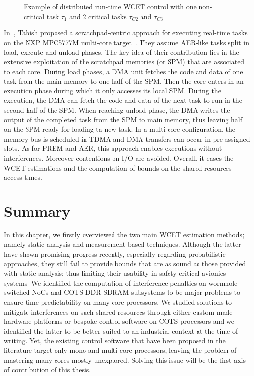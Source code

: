 \documentclass[main.tex]{subfiles}
\begin{document}
\begin{figure}
    \centering
    
    \caption{Example of distributed run-time WCET control with one non-critical task $\tau_1$ and 2 critical tasks $\tau_{C2}$ and $\tau_{C3}$ }
    \label{fig_stateOfTheArt_DistribWCETController}
\end{figure}

In~\cite{Tabish2016}, Tabish \etal proposed a scratchpad-centric approach for
executing real-time tasks on the NXP MPC5777M multi-core
target~\cite{MPC5777M}. They assume AER-like tasks split in load, execute and
unload phases. The key idea of their contribution lies in the extensive
exploitation of the scratchpad memories (or SPM) that are associated to each
core. During load phases, a DMA unit fetches the code and data of one task from
the main memory to one half of the SPM. Then the core enters in an execution
phase during which it only accesses its local SPM. During the execution, the
DMA can fetch the code and data of the next task to run in the second half of
the SPM. When reaching unload phase, the DMA writes the output of the completed
task from the SPM to main memory, thus leaving half on the SPM ready for
loading ta new task. In a multi-core configuration, the memory bus is scheduled
in TDMA and DMA transfers can occur in pre-assigned slots. As for PREM and AER,
this approach enables executions without interferences. Moreover contentions on
I/O are avoided. Overall, it eases the WCET estimations and the computation of
bounds on the shared resources access times.


\section{Summary}
In this chapter, we firstly overviewed the two main WCET estimation methods;
namely static analysis and measurement-based techniques. Although the latter
have shown promising progress recently, especially regarding probabilistic
approaches, they still fail to provide bounds that are as sound as those
provided with static analysis; thus limiting their usability in safety-critical
avionics systems. We identified the computation of interference penalties on
wormhole-switched NoCs and COTS DDR-SDRAM subsystems to be major problems to
ensure time-predictability on many-core processors. We studied solutions to
mitigate interferences on such shared resources through either custom-made
hardware platforms or bespoke control software on COTS processors and we
identified the latter to be better suited to an industrial context at the time
of writing. Yet, the existing control software that have been proposed in the
literature target only mono and multi-core processors, leaving the problem of
mastering many-cores mostly unexplored. Solving this issue will be the first
axis of contribution of this thesis.


\clearpage
\subbiblio
\end{document}
